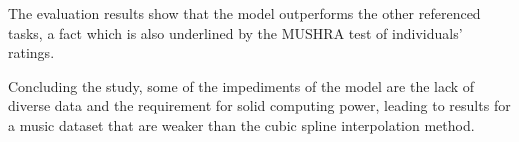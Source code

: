 \documentclass[conference]{IEEEtran}
\begin{document}
	The evaluation results show that the model outperforms the other referenced tasks, a fact which is also underlined by the MUSHRA test of individuals' ratings.

	Concluding the study, some of the impediments of the model are the lack of diverse data and the requirement for solid computing power, leading to results for a music dataset that are weaker than the cubic spline interpolation method.
	

		
\printbibliography
\vspace{12pt}
\end{document}
